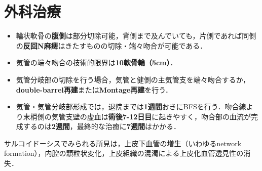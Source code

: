 \newpage
\section{外科治療}

\begin{itemize}

\item 輪状軟骨の\textbf{腹側}は部分切除可能，背側まで及んでいても，片側であれば同側の\textbf{反回N麻痺}はきたすものの切除・端々吻合が可能である．
\item 気管の端々吻合の技術的限界は\textbf{10軟骨輪（5cm）}．
\item 気管分岐部の切除を行う場合，気管と健側の主気管支を端々吻合するか，\textbf{double-barrel再建}または\textbf{Montage再建}を行う．
\item 気管・気管分岐部形成では，退院までは\textbf{1週間}おきにBFSを行う．吻合線より末梢側の気管支壁の虚血は\textbf{術後7-12日目}に起きやすく，吻合部の血流が完成するのは\textbf{2週間}，最終的な治癒に\textbf{7週間}はかかる．

\end{itemize}

サルコイドーシスでみられる所見は，上皮下血管の増生（いわゆるnetwork formation），内腔の顆粒状変化，上皮組織の混濁による上皮化血管透見性の消失．

